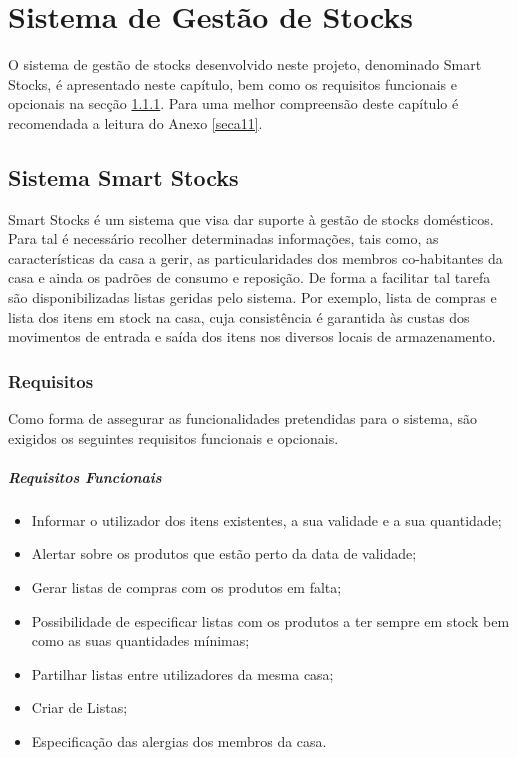 %
%
\chapter{Sistema de Gestão de Stocks} \label{cap2}

O sistema de gestão de stocks desenvolvido neste projeto, denominado Smart Stocks, é apresentado neste capítulo, bem como os requisitos funcionais e opcionais na secção \ref{subsec211}. Para uma melhor compreensão deste capítulo é recomendada a leitura do Anexo \ref{seca11}.

%
%
\section{Sistema Smart Stocks} \label{sec21}
Smart Stocks é um sistema que visa dar suporte à gestão de stocks domésticos. Para tal é necessário recolher determinadas informações, tais como, as características da casa a gerir, as particularidades dos membros co-habitantes da casa e ainda os padrões de consumo e reposição. De forma a facilitar tal tarefa são disponibilizadas listas geridas pelo sistema. Por exemplo, lista de compras e lista dos itens em stock na casa, cuja consistência é garantida às custas dos movimentos de entrada e saída dos itens nos diversos locais de armazenamento.

%
%
\subsection{Requisitos} \label{subsec211}
Como forma de assegurar as funcionalidades pretendidas para o sistema, são exigidos os seguintes requisitos funcionais e opcionais.

\paragraph{Requisitos Funcionais}
\begin{itemize}
	\item Informar o utilizador dos itens existentes, a sua validade e a sua quantidade;
	\item Alertar sobre os produtos que estão perto da data de validade;
	\item Gerar listas de compras com os produtos em falta;
	\item Possibilidade de especificar listas com os produtos a ter sempre em stock bem como as suas quantidades mínimas;
	\item Partilhar listas entre utilizadores da mesma casa;
	\item Criar de Listas;
	\item Especificação das alergias dos membros da casa.
\end{itemize}


